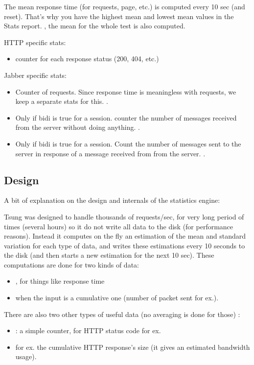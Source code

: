 \documentclass{IDXDOC-en}
\begin{document}
The mean response time (for requests, page, etc.) is computed every 10
sec (and reset). That's why you have the highest mean and lowest mean
values in the Stats report. , the mean for
the whole test is also computed.

HTTP specific stats:
\begin{itemize}
\item counter for each response status (200, 404, etc.)
\end{itemize}

Jabber specific stats:
\begin{itemize}
\item {} Counter of  requests. Since
  response time is meaningless with 
  requests, we keep a separate stats for this. .
\item {} Only if bidi is true for a
  session. counter the number of messages received from the server
  without doing anything.  .
\item {} Only if bidi is true for a
  session. Count the number of messages sent to the server in response
  of a message received from from the server. .
\end{itemize}

\subsection{Design}

A bit of explanation on the design and internals of the statistics engine:

Tsung was designed to handle thousands of requests/sec, for very
long period of times (several hours) so it do not write all data to
the disk (for performance reasons). Instead it computes on the fly an
estimation of the mean and standard variation for each type of data,
and writes these estimations every 10 seconds to the disk (and then
starts a new estimation for the next 10 sec). These computations are
done for two kinds of data:
\begin{itemize}
\item {}, for things like response time
\item {} when the input is a cumulative one (number of
packet sent for ex.).
\end{itemize}

There are also two other types of useful data (no averaging is done for
those) :
\begin{itemize}
\item {}: a simple counter, for HTTP status code for ex.
\item {} for ex. the cumulative HTTP response's size (it gives an
estimated bandwidth usage).
\end{itemize}
\end{document}
